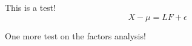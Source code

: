 This is a test!
\begin{equation*}
X - \mu = L F + \epsilon
\end{equation*}

One more test on the factors analysis!
